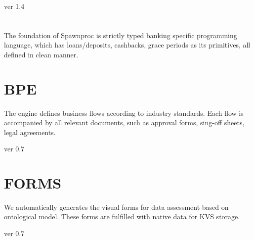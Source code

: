 \documentclass[11pt]{article}
\begin{document}
 ver 1.4


\section*{}
\paragraph{}
The foundation of Spawnproc is strictly typed banking specific
programming language, which has loans/deposits, cashbacks,
grace periods as its primitives, all defined in clean manner.


\section*{BPE}
\paragraph{}
The engine defines business flows according to industry standards.
Each flow is accompanied by all relevant documents, such as
approval forms, sing-off sheets, legal agreements.

 ver 0.7

\section*{FORMS}
\paragraph{}
We automatically generates the visual forms for data assessment
based on ontological model. These forms are fulfilled with native
data for KVS storage.

 ver 0.7
\end{document}
